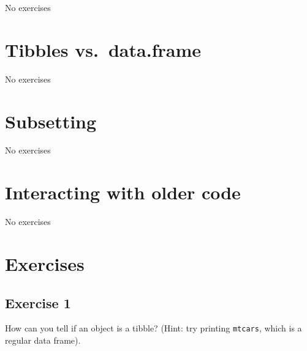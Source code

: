 \documentclass[]{book}
\theoremstyle{plain}
\theoremstyle{remark}
\theoremstyle{definition}
\theoremstyle{definition}
\theoremstyle{definition}
\theoremstyle{remark}
\begin{document}
No exercises

\hypertarget{tibbles-vs.data.frame}{%
\section{Tibbles vs.~data.frame}\label{tibbles-vs.data.frame}}

No exercises

\hypertarget{subsetting}{%
\section{Subsetting}\label{subsetting}}

No exercises

\hypertarget{interacting-with-older-code}{%
\section{Interacting with older
code}\label{interacting-with-older-code}}

No exercises

\hypertarget{exercises}{%
\section{Exercises}\label{exercises}}

\hypertarget{exercise-1-18}{%
\subsection{Exercise 1}\label{exercise-1-18}}

How can you tell if an object is a tibble? (Hint: try printing
\texttt{mtcars}, which is a regular data frame).
\end{document}
